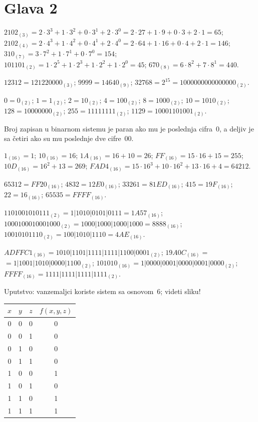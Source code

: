 \section{Glava 2}

$2102_{(3)} = 2 \cdot 3^3 + 1 \cdot 3^2 + 0 \cdot 3^1 + 2 \cdot 3^0 = 2 \cdot 27 + 1 \cdot 9 + 0 \cdot 3 + 2 \cdot 1 = 65$;
$2102_{(4)} = 2 \cdot 4^3 + 1 \cdot 4^2 + 0 \cdot 4^1 + 2 \cdot 4^0 = 2 \cdot 64 + 1 \cdot 16 + 0 \cdot 4 + 2 \cdot 1 = 146$;
$310_{(7)} = 3 \cdot 7^2 + 1 \cdot 7^1 + 0 \cdot 7^0 = 154$;
$101101_{(2)} = 1 \cdot 2^5 + 1 \cdot 2^3 + 1 \cdot 2^2 + 1 \cdot 2^0 = 45$;
$670_{(8)} = 6 \cdot 8^2 + 7 \cdot 8^1 = 440$.

$12312 = 121220000_{(3)}$;
$9999  = 14640_{(9)}$;
$32768 = 2^{15} = 1000000000000000_{(2)}$.


$0 = 0_{(2)}$; $1 = 1_{(2)}$; $2 = 10_{(2)}$; $4 = 100_{(2)}$;
$8 = 1000_{(2)}$; $10 = 1010_{(2)}$; $128 = 10000000_{(2)}$; $255 = 11111111_{(2)}$; $1129 = 10001101001_{(2)}$.

Broj zapisan u binarnom sistemu je paran ako mu je poslednja cifra~0, a deljiv je sa \v cetiri ako su mu
poslednje dve cifre~00.

$1_{(16)} = 1$;
$10_{(16)} = 16$;
$1A_{(16)} = 16 + 10 = 26$;
$FF_{(16)} = 15 \cdot 16 + 15 = 255$;
$10D_{(16)} = 16^2 + 13 = 269$;
$FAD4_{(16)} = 15 \cdot 16^3 + 10 \cdot 16^2 + 13 \cdot 16 + 4 = 64212$.

$65312 = FF20_{(16)}$;
$4832 = 12E0_{(16)}$;
$33261 = 81ED_{(16)}$;
$415 = 19F_{(16)}$;
$22 = 16_{(16)}$;
$65535 = FFFF_{(16)}$.

$1101001010111_{(2)} = 1|1010|0101|0111 = 1A57_{(16)}$;
$1000100010001000_{(2)} = 1000|1000|1000|1000 = 8888_{(16)}$;
$10010101110_{(2)} = 100|1010|1110 = 4AE_{(16)}$.

$ADFFC1_{(16)} = 1010|1101|1111|1111|1100|0001_{(2)}$;
$19A0C_{(16)} =$\newline $=1|1001|1010|0000|1100_{(2)}$;
$101010_{(16)} = 1|0000|0001|0000|0001|0000_{(2)}$;\newline
$FFFF_{(16)} = 1111|1111|1111|1111_{(2)}$.

Uputstvo: vanzemaljci koriste sistem sa osnovom~6; videti sliku!

\begin{tabular}[t]{c|c|c|c}
  $x$ & $y$ & $z$ & $f(x, y, z)$ \\
  \hline\hline
  0 & 0 & 0 & 0\\
  0 & 0 & 1 & 0\\
  0 & 1 & 0 & 0\\
  0 & 1 & 1 & 0\\
  1 & 0 & 0 & 1\\
  1 & 0 & 1 & 0\\
  1 & 1 & 0 & 1\\
  1 & 1 & 1 & 1
\end{tabular}

